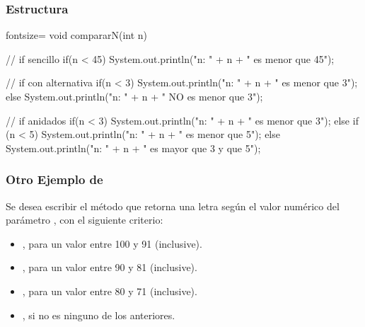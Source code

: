 \documentclass{beamer}
\begin{document}
\begin{frame}[fragile]
  \frametitle{Estructura }
\begin{jsmall*}{fontsize=\scriptsize}
    void compararN(int n) {
      // if sencillo
      if(n < 45) {
        System.out.println("n: " + n + " es menor que 45");
      }

      // if con alternativa
      if(n < 3) {
        System.out.println("n: " + n + " es menor que 3");
      } else {
        System.out.println("n: " + n + " NO es menor que 3");
      }

      // if anidados
      if(n < 3) {
        System.out.println("n: " + n + " es menor que 3");
      } else if (n < 5) {
        System.out.println("n: " + n + " es menor que 5");
      } else {
        System.out.println("n: " + n + " es mayor que 3 y que 5");
      }
    }
\end{jsmall*}
\end{frame}      


\begin{frame}
  \frametitle{Otro Ejemplo de }

  Se desea escribir el método  que retorna una
  letra según el valor numérico del parámetro , con el
  siguiente criterio:
  
  \begin{itemize}
  \item {}, para un valor entre 100 y 91 (inclusive).
  \item {}, para un valor entre 90 y 81 (inclusive).
  \item {}, para un valor entre 80 y 71 (inclusive).
  \item {}, si no es ninguno de los anteriores.
  \end{itemize}

\end{frame}
\end{document}
